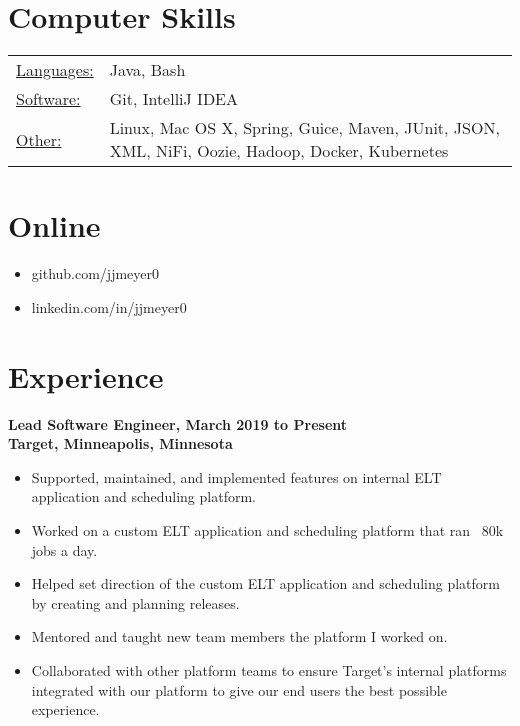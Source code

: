 \documentclass[margin]{res}
\begin{document}

\address{{\bf Contact Information}\\jjmeyer0@gmail.com}
\address{{\bf } \\}

\begin{resume} 

\section{Computer Skills}
\begin{tabular}{l p{4in}}
  \underline{Languages:} & Java, Bash\\
  \underline{Software:} & Git, IntelliJ IDEA \\
  \underline{Other:} & Linux, Mac OS X, Spring, Guice, Maven, JUnit, JSON, XML, NiFi, Oozie, Hadoop, Docker, Kubernetes
\end{tabular}

\section{Online}
\begin{itemize} \itemsep -2pt
\item github.com/jjmeyer0
\item linkedin.com/in/jjmeyer0
\end{itemize}

\section{Experience}
 {\bf Lead Software Engineer, March 2019 to Present\\
 Target, Minneapolis, Minnesota}
 \begin{itemize} \itemsep -2pt
 \item Supported, maintained, and implemented features on internal ELT application and scheduling platform.
 \item Worked on a custom ELT application and scheduling platform that ran ~80k jobs a day.
 \item Helped set direction of the custom ELT application and scheduling platform by creating and planning releases.
 \item Mentored and taught new team members the platform I worked on.
 \item Collaborated with other platform teams to ensure Target's internal platforms integrated with our platform to give our end users the best possible experience.
 \end{itemize}
 

\end{resume}
\end{document}
